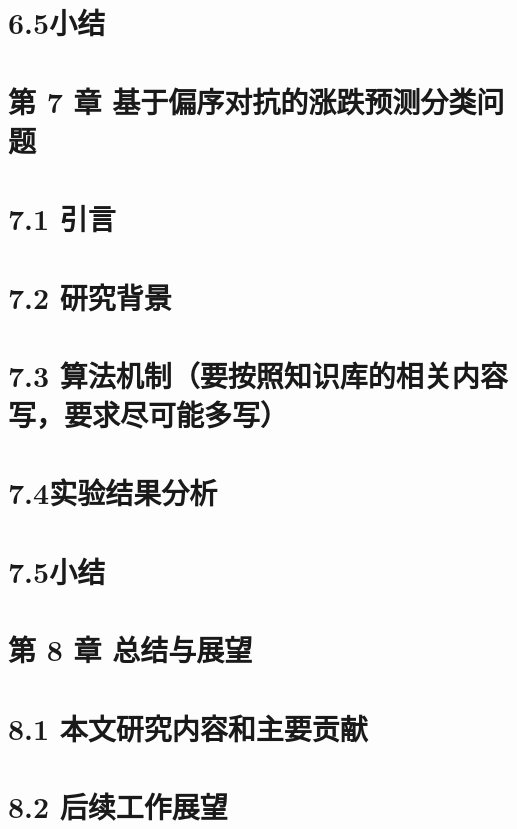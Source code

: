 \section{6.5小结}
\section{第 7 章
基于偏序对抗的涨跌预测分类问题}

\section{7.1 引言}

\section{7.2 研究背景}

\section{7.3
算法机制（要按照知识库的相关内容写，要求尽可能多写）}

\section{7.4实验结果分析}

\section{7.5小结}

\section{\texorpdfstring{第 8 章 总结与展望
}{第 8 章 总结与展望 }}

\section{\texorpdfstring{8.1 本文研究内容和主要贡献
}{8.1 本文研究内容和主要贡献 }}
\section{\texorpdfstring{8.2 后续工作展望
}{8.2 后续工作展望 }}




